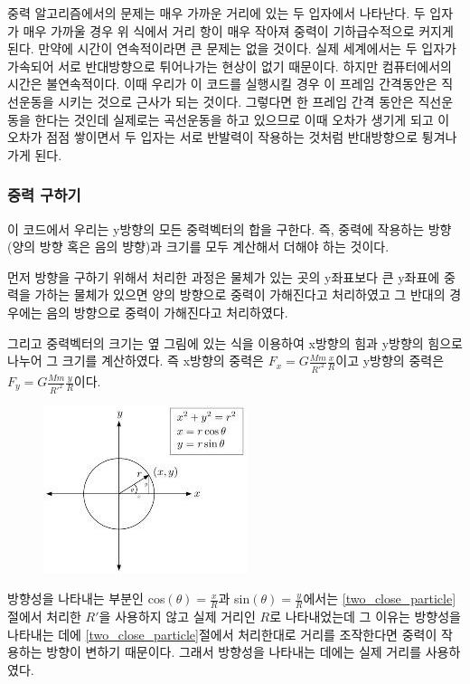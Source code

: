 \documentclass{gshs-hutech}
\begin{document}
중력 알고리즘에서의 문제는 매우 가까운 거리에 있는 두 입자에서 나타난다. 두 입자가 매우 가까울 경우 위 식에서 거리 항이 매우 작아져 중력이 기하급수적으로 커지게 된다. 만약에 시간이 연속적이라면 큰 문제는 없을 것이다. 실제 세계에서는 두 입자가 가속되어 서로 반대방향으로 튀어나가는 현상이 없기 때문이다. 하지만 컴퓨터에서의 시간은 불연속적이다. 이때 우리가 이 코드를 실행시킬 경우 이 프레임 간격동안은 직선운동을 시키는 것으로 근사가 되는 것이다. 그렇다면 한 프레임 간격 동안은 직선운동을 한다는 것인데 실제로는 곡선운동을 하고 있으므로 이때 오차가 생기게 되고 이 오차가 점점 쌓이면서 두 입자는 서로 반발력이 작용하는 것처럼 반대방향으로 튕겨나가게 된다. 

\subsubsection{중력 구하기}

이 코드에서 우리는 y방향의 모든 중력벡터의 합을 구한다. 즉, 중력에 작용하는 방향(양의 방향 혹은 음의 뱡향)과 크기를 모두 계산해서 더해야 하는 것이다. 

먼저 방향을 구하기 위해서 처리한 과정은 물체가 있는 곳의 y좌표보다 큰 y좌표에 중력을 가하는 물체가 있으면 양의 방향으로 중력이 가해진다고 처리하였고 그 반대의 경우에는 음의 방향으로 중력이 가해진다고 처리하였다. 

그리고 중력벡터의 크기는 옆 그림에 있는 식을 이용하여 x방향의 힘과 y방향의 힘으로 나누어 그 크기를 계산하였다. 즉 x방향의 중력은 $F_x = G\frac{Mm}{R'^2}\frac{x}{R}$이고 y방향의 중력은 $F_y = G\frac{Mm}{R'^2}\frac{y}{R}$이다.


\begin{figure}[h]
	\begin{center}
		\includegraphics[scale=0.8]{evaluating_gravity.jpg}
		\caption{ }\label{evaluating_gravity}
	\end{center}
\end{figure}

방향성을 나타내는 부분인 cos$(\theta)=\frac{x}{R}$과 sin$(\theta)=\frac{y}{R}$에서는 \ref{two_close_particle}절에서 처리한 $R'$을 사용하지 않고 실제 거리인 $R$로 나타내었는데 그 이유는 방향성을 나타내는 데에 \ref{two_close_particle}절에서 처리한대로 거리를 조작한다면 중력이 작용하는 방향이 변하기 때문이다. 그래서 방향성을 나타내는 데에는 실제 거리를 사용하였다. 
\end{document}
